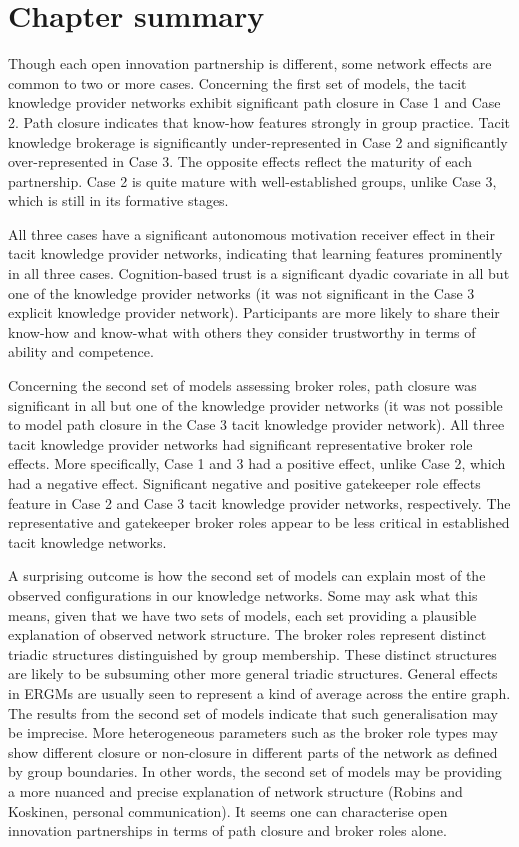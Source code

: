 \section{Chapter summary}

Though each open innovation partnership is different, some network effects are common to two or more cases. Concerning the first set of models, the tacit knowledge provider networks exhibit significant path closure in Case 1 and Case 2. Path closure indicates that know-how features strongly in group practice. Tacit knowledge brokerage is significantly under-represented in Case 2 and significantly over-represented in Case 3. The opposite effects reflect the maturity of each partnership. Case 2 is quite mature with well-established groups, unlike Case 3, which is still in its formative stages. \medskip

All three cases have a significant autonomous motivation receiver effect in their tacit knowledge provider networks, indicating that learning features prominently in all three cases. Cognition-based trust is a significant dyadic covariate in all but one of the knowledge provider networks (it was not significant in the Case 3 explicit knowledge provider network). Participants are more likely to share their know-how and know-what with others they consider trustworthy in terms of ability and competence. \medskip

Concerning the second set of models assessing broker roles, path closure was significant in all but one of the knowledge provider networks (it was not possible to model path closure in the Case 3 tacit knowledge provider network). All three tacit knowledge provider networks had significant representative broker role effects. More specifically, Case 1 and 3 had a positive effect, unlike Case 2, which had a negative effect. Significant negative and positive gatekeeper role effects feature in Case 2 and Case 3 tacit knowledge provider networks, respectively. The representative and gatekeeper broker roles appear to be less critical in established tacit knowledge networks. \medskip

A surprising outcome is how the second set of models can explain most of the observed configurations in our knowledge networks. Some may ask what this means, given that we have two sets of models, each set providing a plausible explanation of observed network structure. The broker roles represent distinct triadic structures distinguished by group membership. These distinct structures are likely to be subsuming other more general triadic structures. General effects in ERGMs are usually seen to represent a kind of average across the entire graph. The results from the second set of models indicate that such generalisation may be imprecise. More heterogeneous parameters such as the broker role types may show different closure or non-closure in different parts of the network as defined by group boundaries. In other words, the second set of models may be providing a more nuanced and precise explanation of network structure (Robins and Koskinen, personal communication). It seems one can characterise open innovation partnerships in terms of path closure and broker roles alone. \medskip

